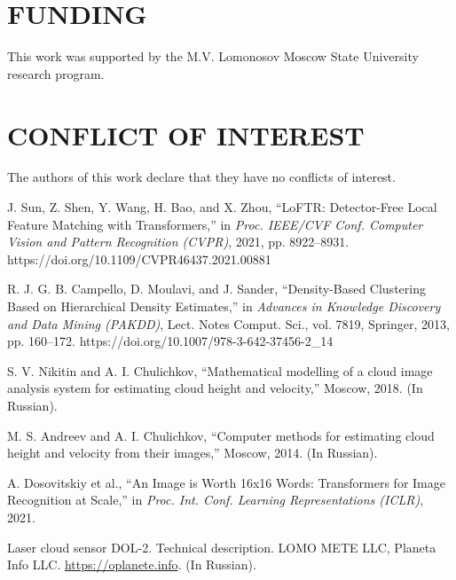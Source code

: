 \documentclass[preprint,
superscriptaddress,
amsmath,amssymb,aps,
twoside,final,secnumarabic,
nofootinbib]{revtex4-2}
\begin{document}
\section*{FUNDING}
This work was supported by the M.V. Lomonosov Moscow State University research program.

\section*{CONFLICT OF INTEREST}
The authors of this work declare that they have no conflicts of interest.

\begin{thebibliography}{}

J. Sun, Z. Shen, Y. Wang, H. Bao, and X. Zhou,
``LoFTR: Detector-Free Local Feature Matching with Transformers,''
in \emph{Proc. IEEE/CVF Conf. Computer Vision and Pattern Recognition (CVPR)},
2021, pp. 8922--8931.
https://doi.org/10.1109/CVPR46437.2021.00881

R. J. G. B. Campello, D. Moulavi, and J. Sander,
``Density-Based Clustering Based on Hierarchical Density Estimates,''
in \emph{Advances in Knowledge Discovery and Data Mining (PAKDD)},
Lect. Notes Comput. Sci., vol. 7819, Springer, 2013, pp. 160--172.
https://doi.org/10.1007/978-3-642-37456-2\_14

S. V. Nikitin and A. I. Chulichkov,
``Mathematical modelling of a cloud image analysis system for estimating cloud height and velocity,''
Moscow, 2018. (In Russian).

M. S. Andreev and A. I. Chulichkov,
``Computer methods for estimating cloud height and velocity from their images,''
Moscow, 2014. (In Russian).

A. Dosovitskiy et al.,
``An Image is Worth 16x16 Words: Transformers for Image Recognition at Scale,''
in \emph{Proc. Int. Conf. Learning Representations (ICLR)}, 2021.

Laser cloud sensor DOL-2. Technical description.
LOMO METE LLC, Planeta Info LLC.
\url{https://oplanete.info}. (In Russian).

\end{thebibliography}
\end{document}
